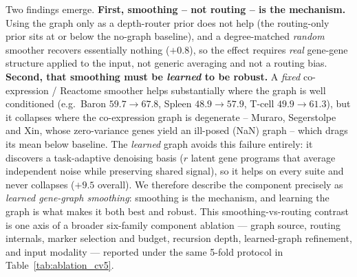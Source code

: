 \documentclass[letterpaper]{article}
\begin{document}
Two findings emerge. \textbf{First, smoothing -- not routing -- is the mechanism.} Using
the graph only as a depth-router prior does not help (the routing-only prior sits at or below
the no-graph baseline), and a degree-matched \emph{random} smoother recovers essentially
nothing ($+0.8$), so the effect requires \emph{real} gene-gene structure applied to the
input, not generic averaging and not a routing bias. \textbf{Second, that smoothing must
be \emph{learned} to be robust.} A \emph{fixed} co-expression / Reactome smoother helps
substantially where the graph is well conditioned (e.g.\ Baron $59.7\!\to\!67.8$, Spleen
$48.9\!\to\!57.9$, T-cell $49.9\!\to\!61.3$), but it collapses where the co-expression
graph is degenerate -- Muraro, Segerstolpe and Xin, whose zero-variance genes yield an
ill-posed (NaN) graph -- which drags its mean below baseline. The \emph{learned} graph
avoids this failure entirely: it discovers a task-adaptive denoising basis ($r$ latent
gene programs that average independent noise while preserving shared signal), so it helps
on every suite and never collapses ($+9.5$ overall). We therefore describe the component
precisely as \emph{learned gene-graph smoothing}: smoothing is the mechanism, and learning
the graph is what makes it both best and robust. This smoothing-vs-routing contrast is one
axis of a broader six-family component ablation --- graph source, routing internals, marker
selection and budget, recursion depth, learned-graph refinement, and input modality ---
reported under the same 5-fold protocol in Table~\ref{tab:ablation_cv5}.
\end{document}
